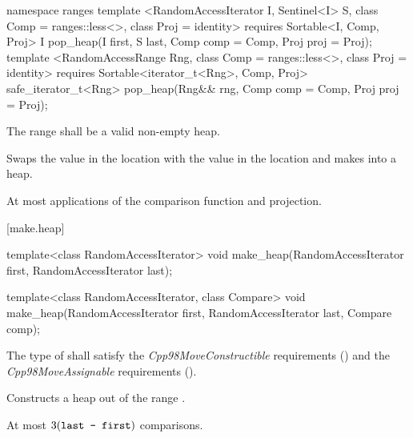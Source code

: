 \begin{addedblock}
%
\begin{itemdecl}
namespace ranges {
  template <RandomAccessIterator I, Sentinel<I> S, class Comp = ranges::less<>,
            class Proj = identity>
      requires Sortable<I, Comp, Proj>
    I pop_heap(I first, S last, Comp comp = Comp{}, Proj proj = Proj{});
  template <RandomAccessRange Rng, class Comp = ranges::less<>, class Proj = identity>
      requires Sortable<iterator_t<Rng>, Comp, Proj>
    safe_iterator_t<Rng> pop_heap(Rng&& rng, Comp comp = Comp{}, Proj proj = Proj{});
}
\end{itemdecl}

\begin{itemdescr}
\pnum
\requires
The range
shall be a valid non-empty heap.

\pnum
\effects
Swaps the value in the location 
with the value in the location
and makes
into a heap.

\pnum
\returns {}

\pnum
\complexity
At most
applications of the comparison function and projection.
\end{itemdescr}
\end{addedblock}

[make.heap]{}

%
\begin{itemdecl}
template<class RandomAccessIterator>
  void make_heap(RandomAccessIterator first, RandomAccessIterator last);

template<class RandomAccessIterator, class Compare>
  void make_heap(RandomAccessIterator first, RandomAccessIterator last,
                 Compare comp);
\end{itemdecl}

\begin{itemdescr}
\pnum
\requires The type of  shall satisfy
the \textit{Cpp98MoveConstructible} requirements
() and the
\textit{Cpp98MoveAssignable} requirements
().

\pnum
\effects
Constructs a heap out of the range
.

\pnum
\complexity
At most
$3(\texttt{last - first})$
comparisons.
\end{itemdescr}

